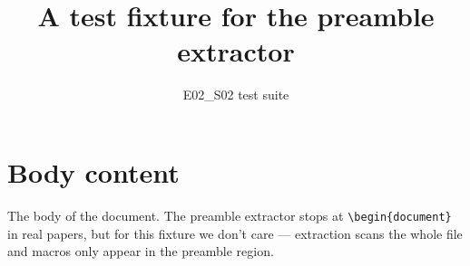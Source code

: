 \documentclass{amsart}
\title{A test fixture for the preamble extractor}
\author{E02\_S02 test suite}
\begin{document}
\maketitle
\section{Body content}
The body of the document. The preamble extractor stops at \verb|\begin{document}|
in real papers, but for this fixture we don't care — extraction scans the
whole file and macros only appear in the preamble region.
\end{document}

